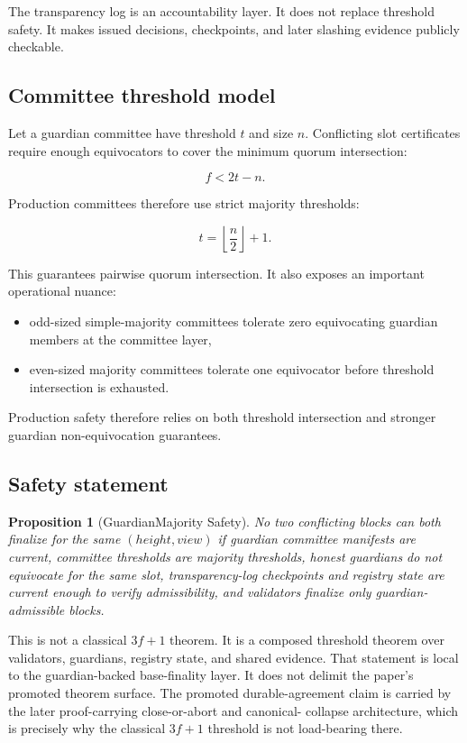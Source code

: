 \documentclass[11pt]{article}
\newtheorem{proposition}{Proposition}
\begin{document}
The transparency log is an accountability layer. It does not replace threshold
safety. It makes issued decisions, checkpoints, and later slashing evidence
publicly checkable.

\subsection{Committee threshold model}

Let a guardian committee have threshold \(t\) and size \(n\). Conflicting slot
certificates require enough equivocators to cover the minimum quorum
intersection:

\[
f < 2t - n.
\]

Production committees therefore use strict majority thresholds:

\[
t = \left\lfloor \frac{n}{2} \right\rfloor + 1.
\]

This guarantees pairwise quorum intersection. It also exposes an important
operational nuance:

\begin{itemize}[leftmargin=1.5em]
\item odd-sized simple-majority committees tolerate zero equivocating guardian
members at the committee layer,
\item even-sized majority committees tolerate one equivocator before threshold
intersection is exhausted.
\end{itemize}

Production safety therefore relies on both threshold intersection and stronger
guardian non-equivocation guarantees.

\subsection{Safety statement}

\begin{proposition}[GuardianMajority Safety]
No two conflicting blocks can both finalize for the same \((height, view)\) if
guardian committee manifests are current, committee thresholds are majority
thresholds, honest guardians do not equivocate for the same slot,
transparency-log checkpoints and registry state are current enough to verify
admissibility, and validators finalize only guardian-admissible blocks.
\end{proposition}

This is not a classical \(3f + 1\) theorem. It is a composed threshold theorem
over validators, guardians, registry state, and shared evidence. That
statement is local to the guardian-backed base-finality layer. It does not
delimit the paper's promoted theorem surface. The promoted durable-agreement
claim is carried by the later proof-carrying close-or-abort and canonical-
collapse architecture, which is precisely why the classical \(3f + 1\)
threshold is not load-bearing there.
\end{document}
